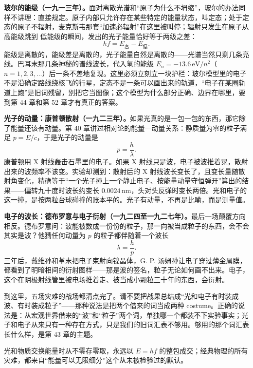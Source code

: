 \textbf{玻尔的能级（一九一三年）。}面对离散光谱和“原子为什么不坍缩”，玻尔的办法同样不讲理：直接规定。原子内部只允许存在某些特定的能量状态，叫定态；处于定态的原子不辐射，麦克斯韦那套“加速必辐射”在这里被叫停；辐射只发生在原子从高能级跳到
低能级的瞬间，发出的光子能量恰好等于两级之差：
\[
hf = E_{\text{高}} - E_{\text{低}}.
\]
能级是离散的，能级差是离散的，光子能量自然是离散的——光谱当然只剩几条亮线。巴耳末那几条神秘的谱线波长，代入氢的能级 \(E_n = -13.6\,\mathrm{eV}/n^2\)（\(n = 1, 2, 3, \dots\)）后一条不差地复现。这里必须立刻立一块护栏：玻尔模型里的电子不是沿确定路线绕核飞的行星，定态不是一条可以画出来的轨道，“电子在某圈轨道上跑”是旧词残留，别把它当图像；这个模型为什么部分正确、边界在哪里，要到第 44 章和第 52 章才有真正的答案。

\textbf{光子的动量：康普顿散射（一九二三年）。}如果光真的是一包一包的东西，那它除了能量还该有动量。第 40 章讲过相对论的能量—动量关系：静质量为零的粒子满足 \(p = E/c\)，于是光子的动量是
\[
p = \frac{h}{\lambda}.
\]
康普顿用 X 射线轰击石墨里的电子。如果 X 射线只是波，电子被波推着晃，散射出来的波频率不该变。实验却测到：散射后的 X 射线波长变长了，且变长量随散射角变化，精确等于“一个光子撞上一个静止电子、按能量动量守恒弹开”算出的结果——偏转九十度时波长约变长 \(0.0024\,\mathrm{nm}\)，头对头反弹时变长两倍。光和电子的这一撞，是按两粒台球碰撞的账本平的。光子有动量，不再是比喻，而是测量值。

\textbf{电子的波长：德布罗意与电子衍射（一九二四至一九二七年）。}最后一场颠覆方向相反。德布罗意问：波能被数成一份份的粒子，那一向被当成粒子的东西，会不会其实是波？他猜任何动量为 \(p\) 的粒子都伴随着一个波长
\[
\lambda = \frac{h}{p}.
\]
三年后，戴维孙和革末把电子束射向镍晶体，G. P. 汤姆孙让电子穿过薄金属膜，都看到了明暗相间的衍射图样——那是波的签名，粒子无论如何画不出来。电子，这个在阴极射线管里被电场推着走、被当成小颗粒三十年的东西，会衍射。

到这里，五场灾难的战场都清点完了。请不要把战果总结成“光和电子有时装成波、有时装成粒子”——那种说法是把两个借来的词当成两种 costume。正确的说法是：从宏观世界借来的“波”和“粒子”两个词，单独哪一个都装不下实验事实；光子和电子从来只有一种存在方式，只是我们的旧词汇表不够用。够用的那个词汇表长什么样，是第 43 章的主题。


\begin{oneline}
光和物质交换能量时从不零存零取，永远以 \(E = hf\) 的整包成交；经典物理的所有灾难，都来自“能量可以无限细分”这个从未被检验过的默认。
\end{oneline}


